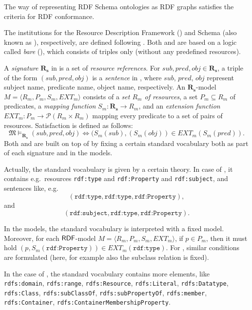 \documentclass[10pt,fleqn,final]{scrreprt}
\newenvironment{definitions}[0]{\medskip }{}
\begin{document}
\begin{definitions}
The way of representing RDF Schema ontologies as RDF graphs satisfies the criteria for RDF conformance.


\begin{definition}
  
The institutions for the Resource Description
Framework (\RDF) and \RDF Schema (also known as \RDFS), respectively, are defined following \cite{Lucanu}. Both \RDF and \RDFS 
 are based on a logic called \emph{bare} \RDF (\SimpleRDF), which consists
of triples only (without any predefined resources).

A \textit{signature} $\mathbf{R_s}$ in \SimpleRDF is a set of
\textit{resource references}. For $sub, pred, obj \in \mathbf{R_s}$, a
triple of the form $(sub, pred, obj)$ is a \textit{sentence} in \SimpleRDF,
where $sub$, $pred$, $obj$ represent subject name, predicate name,
object name, respectively. An $\mathbf{R_s}$-model $M =
\langle R_m, P_m, S_m, EXT_m \rangle$ consists of a \textit{set $R_m$
  of resources}, a set $P_m \subseteq R_m$ of predicates, a
\textit{mapping function} $S_m:\mathbf{R_s} \rightarrow R_m$, and an
\textit{extension function} $EXT_m: P_m \rightarrow \mathcal{P}(R_m
\times R_m)$ mapping every predicate to a set of pairs of
resources. Satisfaction is defined as follows:
%
\[\mathfrak{M} \models_{\mathbf{R_s}} (sub, pred, obj) \Leftrightarrow (S_{m}(sub),
(S_{m}(obj)) \in EXT_{m} (S_m(pred)). \]
%
Both \RDF and \RDFS are built on top of \SimpleRDF by fixing a certain
standard vocabulary both as part of each signature and in the models.

Actually, the standard vocabulary is given by a certain theory. In case
of \RDF, it contains e.g.\ resources \texttt{rdf:type} and
\texttt{rdf:Property} and \texttt{rdf:subject}, and sentences like, e.g.\
$$(\texttt{rdf:type},\texttt{rdf:type},\texttt{rdf:Property}),$$ and 
$$(\texttt{rdf:subject}, \texttt{rdf:type},\texttt{rdf:Property}).$$

In the models, the standard vocabulary is interpreted with a fixed
model.  Moreover, for each $\mathsf{RDF}$-model $M = \langle R_m, P_m, S_m,
EXT_m \rangle$, if $p\in P_m$, then it must hold
$(p,S_m(\texttt{rdf:Property}))\in EXT_m(\texttt{rdf:type})$.
For \RDFS, similar conditions are formulated (here, for example also
the subclass relation is fixed).


In the case of \RDFS, the standard vocabulary contains more elements,
like
\texttt{rdfs:domain},
\texttt{rdfs:range}, \texttt{rdfs:Resource}, \texttt{rdfs:Literal}, \texttt{rdfs:Datatype}, \texttt{rdfs:Class},
\texttt{rdfs:subClassOf}, \texttt{rdfs:subPropertyOf}, \texttt{rdfs:member}, \texttt{rdfs:Container},
\texttt{rdfs:ContainerMembershipProperty}.


\end{definition}
\end{definitions}
\end{document}
